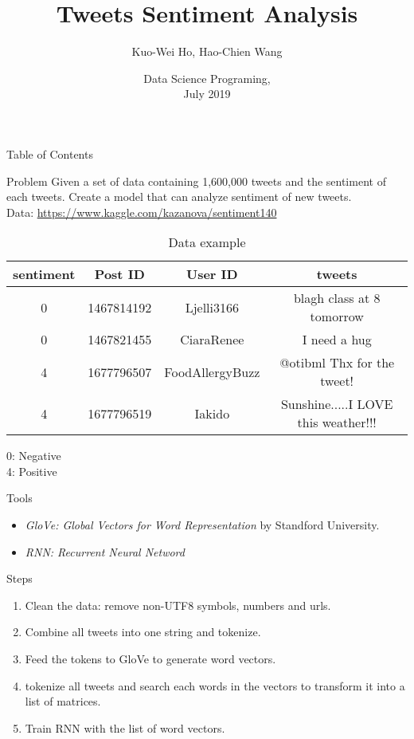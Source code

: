 \documentclass{beamer}
\title{Tweets Sentiment Analysis}
\author{Kuo-Wei Ho\inst{1}, Hao-Chien Wang\inst{2}}
\institute[NTU]
{
	\inst{1}
	NTUEE
	\and
	\inst{2}
	NTUPhys
}
\date[DSP 2019]
{Data Science Programing,\\July 2019}
\begin{document}
\frame{\titlepage}

\begin{frame}{Table of Contents}
	\tableofcontents[currentsection]
\end{frame}

\begin{frame}{Problem}
	Given a set of data containing 1,600,000 tweets and the sentiment of each tweets. Create a model that can analyze sentiment of new tweets.\\
	{\scriptsize Data: \url{https://www.kaggle.com/kazanova/sentiment140}}
	\begin{table}[htpb]
		\tiny
		\centering
		\caption{Data example}
		\label{tab:data}
		\begin{tabular}{c c c c}
			sentiment & Post ID & User ID & tweets \\
			\hline
			 0 & 1467814192 & Ljelli3166 & blagh class at 8 tomorrow  \\
			 0 & 1467821455 & CiaraRenee & I need a hug  \\
			 4 & 1677796507 & FoodAllergyBuzz & @otibml Thx for the tweet!  \\
			 4 & 1677796519 & Iakido & Sunshine.....I LOVE this weather!!!  \\
		\end{tabular}
	\end{table}
	0: Negative \\
	4: Positive
\end{frame}

\begin{frame}{Tools}
	\begin{itemize}
		\item \textit{GloVe: Global Vectors for Word Representation} by Standford University.
		\item \textit{RNN: Recurrent Neural Netword}
	\end{itemize}
\end{frame}

\begin{frame}{Steps}
	\begin{enumerate}
		\item Clean the data: remove non-UTF8 symbols, numbers and urls.
		\item Combine all tweets into one string and tokenize.
		\item Feed the tokens to GloVe to generate word vectors.
		\item tokenize all tweets and search each words in the vectors to transform it into a list of matrices.
		\item Train RNN with the list of word vectors.
	\end{enumerate}	
\end{frame}
\end{document}

